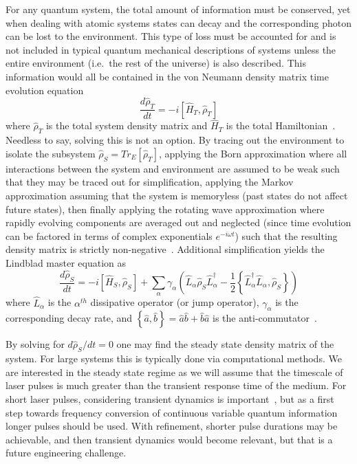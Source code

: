 \documentclass[aps,pra,showpacs,amsmath,amssymb,nofootinbib,longbibliography,superscriptaddress
]{revtex4-1}
\theoremstyle{definition}
\theoremstyle{remark}
\newcommand{\0}{\hat{0}}
\begin{document}
For any quantum system, the total amount of information must be conserved, yet when dealing with atomic systems states can decay and the corresponding photon can be lost to the environment. This type of loss must be accounted for and is not included in typical quantum mechanical descriptions of systems unless the entire environment (i.e.~the rest of the universe) is also described. This information would all be contained in the von Neumann density matrix time evolution equation
\begin{equation}
    \frac{d \hat{\rho}_T}{dt} = -i \left[ \hat{H}_T, \hat{\rho}_T \right]
\end{equation}
where $\hat{\rho}_T$ is the total system density matrix and $\hat{H}_T$ is the total Hamiltonian~\cite{Manzano}. Needless to say, solving this is not an option. By tracing out the environment to isolate the subsystem $\hat{\rho}_S = Tr_E\left[ \hat{\rho}_T \right]$, applying the Born approximation where all interactions between the system and environment are assumed to be weak such that they may be traced out for simplification, applying the Markov approximation assuming that the system is memoryless (past states do not affect future states), then finally applying the rotating wave approximation where rapidly evolving components are averaged out and neglected (since time evolution can be factored in terms of complex exponentials $e^{-i \omega t}$) such that the resulting density matrix is strictly non-negative~\cite{Manzano}\cite{Brasil}. Additional simplification yields the Lindblad master equation as
\begin{equation}\label{LindbladMasterEquation}
    \frac{d \hat{\rho}_S}{dt} = -i \left[ \hat{H}_S, \hat{\rho}_S \right] + \sum_{\alpha} \gamma_{\alpha} \left( \hat{L}_{\alpha} \hat{\rho}_S \hat{L}_{\alpha}^{\dagger} - \frac{1}{2} \left\{ \hat{L}_{\alpha}^{\dagger} \hat{L}_{\alpha}, \hat{\rho}_S \right\}\right)
\end{equation}
where $\hat{L}_{\alpha}$ is the $\alpha^{th}$ dissipative operator (or jump operator), $\gamma_{\alpha}$ is the corresponding decay rate, and $\left\{ \hat{a}, \hat{b} \right\} = \hat{a} \hat{b} + \hat{b}\hat{a}$ is the anti-commutator~\cite{Lidar}.

By solving for $d \hat{\rho}_S / dt = 0$ one may find the steady state density matrix of the system. For large systems this is typically done via computational methods. We are interested in the steady state regime as we will assume that the timescale of laser pulses is much greater than the transient response time of the medium. For short laser pulses, considering transient dynamics is important~\cite{MacRae}, but as a first step towards frequency conversion of continuous variable quantum information longer pulses should be used. With refinement, shorter pulse durations may be achievable, and then transient dynamics would become relevant, but that is a future engineering challenge.
\end{document}
